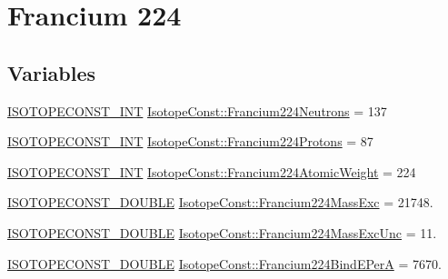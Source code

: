 \hypertarget{group___isotope_const-_francium-_fr224}{}\section{Francium 224}
\label{group___isotope_const-_francium-_fr224}
\subsection*{Variables}
\begin{DoxyCompactItemize}
\item 
\mbox{\hyperlink{group___isotope_const-_macros_ga5f18360b3e99483a35c32d789e62621c}{I\+S\+O\+T\+O\+P\+E\+C\+O\+N\+S\+T\+\_\+\+I\+NT}} \mbox{\hyperlink{group___isotope_const-_francium-_fr224_ga0bf8485603ec4c95253117864d362733}{Isotope\+Const\+::\+Francium224\+Neutrons}} = 137
\item 
\mbox{\hyperlink{group___isotope_const-_macros_ga5f18360b3e99483a35c32d789e62621c}{I\+S\+O\+T\+O\+P\+E\+C\+O\+N\+S\+T\+\_\+\+I\+NT}} \mbox{\hyperlink{group___isotope_const-_francium-_fr224_ga93d73e3361483da4d60ea1ea2b7fd28b}{Isotope\+Const\+::\+Francium224\+Protons}} = 87
\item 
\mbox{\hyperlink{group___isotope_const-_macros_ga5f18360b3e99483a35c32d789e62621c}{I\+S\+O\+T\+O\+P\+E\+C\+O\+N\+S\+T\+\_\+\+I\+NT}} \mbox{\hyperlink{group___isotope_const-_francium-_fr224_ga10a8074eed03ee8047ef9aafe5699488}{Isotope\+Const\+::\+Francium224\+Atomic\+Weight}} = 224
\item 
\mbox{\hyperlink{group___isotope_const-_macros_ga8f45a7272ce02c0b4c65c44636ed719a}{I\+S\+O\+T\+O\+P\+E\+C\+O\+N\+S\+T\+\_\+\+D\+O\+U\+B\+LE}} \mbox{\hyperlink{group___isotope_const-_francium-_fr224_ga04c0b4f8450a010cb5611e69234412b8}{Isotope\+Const\+::\+Francium224\+Mass\+Exc}} = 21748.
\item 
\mbox{\hyperlink{group___isotope_const-_macros_ga8f45a7272ce02c0b4c65c44636ed719a}{I\+S\+O\+T\+O\+P\+E\+C\+O\+N\+S\+T\+\_\+\+D\+O\+U\+B\+LE}} \mbox{\hyperlink{group___isotope_const-_francium-_fr224_ga121190a6e3ab01e48386ba730e815d0a}{Isotope\+Const\+::\+Francium224\+Mass\+Exc\+Unc}} = 11.
\item 
\mbox{\hyperlink{group___isotope_const-_macros_ga8f45a7272ce02c0b4c65c44636ed719a}{I\+S\+O\+T\+O\+P\+E\+C\+O\+N\+S\+T\+\_\+\+D\+O\+U\+B\+LE}} \mbox{\hyperlink{group___isotope_const-_francium-_fr224_ga3f499d37e2a55f9a3a1b5cfdfbf9172f}{Isotope\+Const\+::\+Francium224\+Bind\+E\+PerA}} = 7670.
\item 

\end{DoxyCompactItemize}

